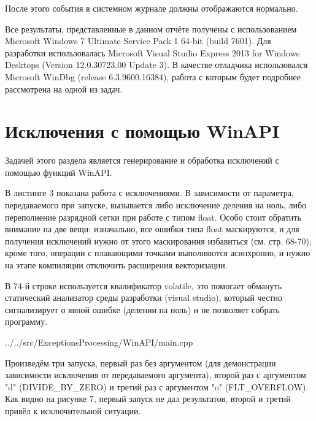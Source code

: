 \documentclass[a4paper, 12pt]{report}		%
\begin{document}
После этого события в системном журнале должны отображаются нормально.

Все результаты, представленные в данном отчёте получены с использованием Microsoft Windows 7 Ultimate Service Pack 1 64-bit (build 7601). Для разработки использовалась Microsoft Visual Studio Express 2013 for Windows Desktops (Version 12.0.30723.00 Update 3). В качестве отладчика использовался Microsoft WinDbg (release 6.3.9600.16384), работа с которым будет подробнее рассмотрена на одной из задач.


\chapter*{Исключения с помощью WinAPI}

Задачей этого раздела является генерирование и обработка исключений с помощью функций WinAPI.

В листинге 3 показана работа с исключениями\cite{Dushutina}. В зависимости от параметра, передаваемого при запуске, вызывается либо исключение деления на ноль, либо переполнение разрядной сетки при работе с типом float. Особо стоит обратить внимание на две вещи: изначально, все ошибки типа float маскируются, и для получения исключений нужно от этого маскирования избавиться (см. стр. 68-70); кроме того, операции с плавающими точками выполняются асинхронно, и нужно на этапе компиляции отключить расширения векторизации.

В 74-й строке используется квалификатор volatile, это помогает обмануть статический анализатор среды разработки (visual studio), который честно сигнализирует о явной ошибке (делении на ноль) и не позволяет собрать программу.


{../../src/ExceptionsProcessing/WinAPI/main.cpp}

Произведём три запуска, первый раз без аргументом (для демонстрации зависимости исключения от передаваемого аргумента), второй раз с аргументом "\-d" (DIVIDE\_BY\_ZERO) и третий раз с аргументом "\-o" (FLT\_OVERFLOW). Как видно на рисунке 7, первый запуск не дал результатов, второй и третий привёл к исключительной ситуации.
\end{document}
